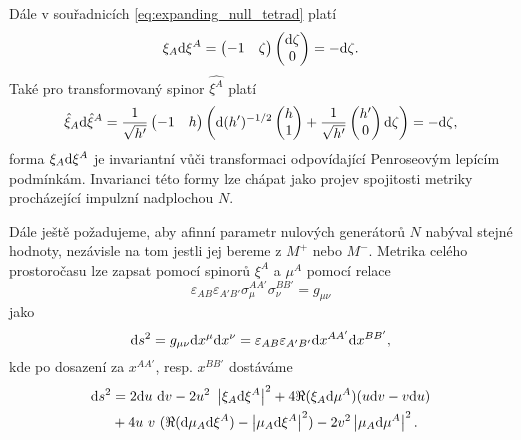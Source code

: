 Dále v souřadnicích \eqref{eq:expanding_null_tetrad} platí
\begin{equation}
    \xi_A \mathrm{d} \xi^A = \begin{pmatrix}
        -1 & \zeta
    \end{pmatrix}
    \begin{pmatrix}
        \mathrm{d}\zeta \\ 0
    \end{pmatrix} = -\mathrm{d}\zeta.
\end{equation}
Také pro transformovaný spinor $\hat{\xi^A}$ platí
\begin{equation}
    \hat{\xi}_A \mathrm{d} \hat{\xi}^A = \frac{1}{\sqrt{h'}} \begin{pmatrix}
        -1 & h
    \end{pmatrix}  \left( \mathrm{d} (h')^{-1/2} \begin{pmatrix}
        h \\ 1
    \end{pmatrix} + \frac{1}{\sqrt{h'}} \begin{pmatrix}
        h' \\ 0
    \end{pmatrix} \mathrm{d} \zeta \right) = -\mathrm{d} \zeta,
\end{equation}
forma $\xi_A \mathrm{d} \xi^A$ je invariantní vůči transformaci odpovídající
Penroseovým lepícím podmínkám. Invarianci této formy lze chápat jako
projev spojitosti metriky procházející impulzní nadplochou $N$.

Dále ještě požadujeme, aby afinní parametr nulových generátorů $N$ nabýval stejné
hodnoty, nezávisle na tom jestli jej bereme z $M^+$ nebo $M^-$. Metrika celého
prostoročasu lze zapsat pomocí spinorů $\xi^A$ a $\mu^A$ pomocí relace \cite{doi:10.1142/5222}
\begin{equation}
    \varepsilon_{AB} \varepsilon_{A'B'} \sigma_{\mu}^{AA'} \sigma_{\nu}^{BB'} = g_{\mu \nu}
\end{equation}
jako
\begin{equation}
    \mathrm{d} s^2 = g_{\mu \nu} \mathrm{d} x^\mu \mathrm{d} x^\nu = \varepsilon_{AB} \varepsilon_{A'B'} \mathrm{d} x^{AA'} \mathrm{d} x^{BB'},
\end{equation}
kde po dosazení za $x^{AA'}$, resp. $x^{BB'}$ dostáváme
\begin{equation}
    \begin{split}
        \mathrm{d} s^2 &= 2 \mathrm{d} u ~ \mathrm{d} v - 2 u^2 ~ \left| \xi_A \mathrm{d} \xi^A \right|^2 + 4 \Re(\xi_A \mathrm{d} \mu^A)(u \mathrm{d} v - v \mathrm{d} u) \\
        &+ 4 u ~v ~ (\Re(\mathrm{d} \mu_A \mathrm{d} \xi^A) - \left|\mu_A \mathrm{d} \xi^A \right|^2) - 2 v^2 \left|\mu_A \mathrm{d} \mu^A \right|^2.
    \end{split}
\end{equation}

